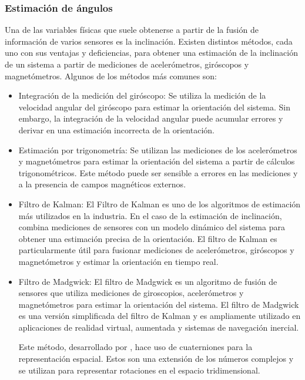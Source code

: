 \subsubsection{Estimación de ángulos}

Una de las variables físicas que suele obtenerse a partir de la fusión de información de varios sensores es la inclinación. Existen distintos métodos, cada uno con sus ventajas y deficiencias, para obtener una estimación de la inclinación de un sistema a partir de mediciones de acelerómetros, giróscopos y magnetómetros. Algunos de los métodos más comunes son:

\begin{itemize}
    \item Integración de la medición del giróscopo: Se utiliza la medición de la velocidad angular del giróscopo para estimar la orientación del sistema. Sin embargo, la integración de la velocidad angular puede acumular errores y derivar en una estimación incorrecta de la orientación.
    \item Estimación por trigonometría: Se utilizan las mediciones de los acelerómetros y magnetómetros para estimar la orientación del sistema a partir de cálculos trigonométricos. Este método puede ser sensible a errores en las mediciones y a la presencia de campos magnéticos externos.
	\item Filtro de Kalman: El Filtro de Kalman es uno de los algoritmos de estimación más utilizados en la industria. En el caso de la estimación de inclinación, combina mediciones de sensores con un modelo dinámico del sistema para obtener una estimación precisa de la orientación. El filtro de Kalman es particularmente útil para fusionar mediciones de acelerómetros, giróscopos y magnetómetros y estimar la orientación en tiempo real.
	
	\item Filtro de Madgwick: El filtro de Madgwick es un algoritmo de fusión de sensores que utiliza mediciones de giroscopios, acelerómetros y magnetómetros para estimar la orientación del sistema. El filtro de Madgwick es una versión simplificada del filtro de Kalman y es ampliamente utilizado en aplicaciones de realidad virtual, aumentada y sistemas de navegación inercial.
	
    Este método, desarrollado por \cite{madgwick2010efficient}, hace uso de cuaterniones para la representación espacial. Estos son una extensión de los números complejos y se utilizan para representar rotaciones en el espacio tridimensional.


\end{itemize}
